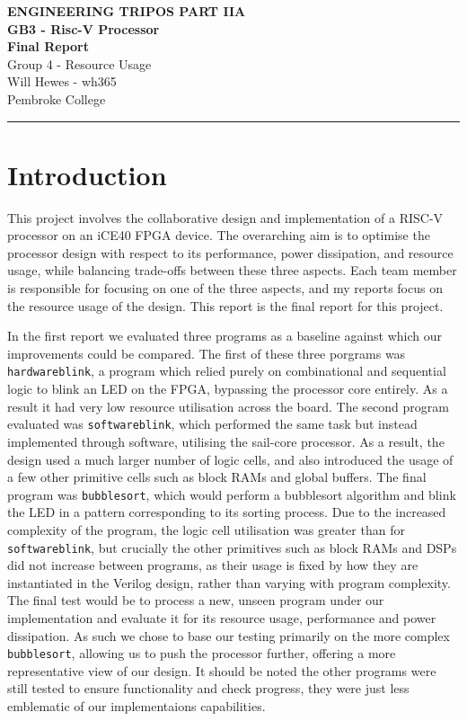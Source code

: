 \documentclass[a4paper,10pt]{article}
\renewcommand{\maketitle}{
    \begin{center}
        \LARGE \textbf{ENGINEERING TRIPOS PART IIA} \\ 
        \vspace{0.5em}
        \Large \textbf{GB3 - Risc-V Processor} \\ 
        \vspace{0.5em}
        \textbf{Final Report} \\
        \large Group 4 - Resource Usage \\
        \vspace{1em}
        \large Will Hewes - wh365 \\ 
        Pembroke College \\ 
        \vspace{0.5em}
    \end{center}
}
\begin{document}

\maketitle
\hrule
\tableofcontents
\newpage
{} \setcounter{page}{1}

\section{Introduction}
\label{sec:Introduction}

This project involves the collaborative design and implementation 
of a RISC-V processor on an iCE40 FPGA device. 
The overarching aim is to optimise 
the processor design with respect to its 
performance, power dissipation, and resource usage, 
while balancing trade-offs between these three aspects. 
Each team member is responsible for focusing on one of the three aspects,
and my reports focus on the resource usage of the design.
This report is the final report for this project.

In the first report we evaluated three programs as a baseline against
which our improvements could be compared.
The first of these three porgrams was \texttt{hardwareblink},
a program which relied purely on combinational and sequential logic
to blink an LED on the FPGA,
bypassing the processor core entirely. 
As a result it had very low resource utilisation across the board.
The second program evaluated was \texttt{softwareblink},
which performed the same task but instead implemented through software,
utilising the sail-core processor.
As a result, the design used a much larger number of logic cells,
and also introduced the usage of a few other primitive cells such as 
block RAMs and global buffers.
The final program was \texttt{bubblesort}, which would perform a 
bubblesort algorithm and blink the LED in a pattern
corresponding to its sorting process.
Due to the increased complexity of the program,
the logic cell utilisation was greater than for \texttt{softwareblink},
but crucially the other primitives such as 
block RAMs and DSPs did not increase between programs,
as their usage is fixed by how they are instantiated in the Verilog design, 
rather than varying with program complexity.
The final test would be to process 
a new, unseen program under our implementation and evaluate it for its 
resource usage, performance and power dissipation.
As such we chose to base our testing primarily 
on the more complex \texttt{bubblesort},
allowing us to push the processor further,
offering a more representative view of our design.
It should be noted the other programs were still tested
to ensure functionality and check progress,
they were just less emblematic of our implementaions capabilities.
\end{document}
